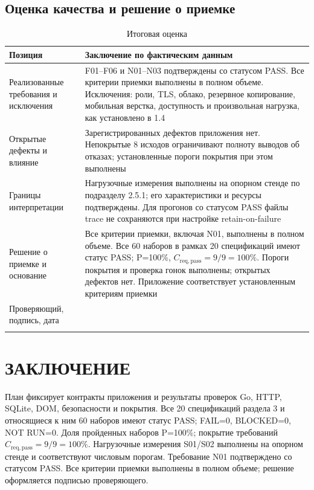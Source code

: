\documentclass[12pt,a4paper]{extarticle}
\newcommand{\struct}[1]{%
  \clearpage\begingroup
  \titlespacing*{\section}{0pt}{0pt}{18pt}%
  \section*{\centering #1}\endgroup%
  \addcontentsline{toc}{section}{#1}}
\begin{document}
\subsection{Оценка качества и решение о приемке}
\begin{longtable}{|P{54mm}|P{98mm}|}
\caption{Итоговая оценка}\\\hline
Позиция & Заключение по фактическим данным \\\hline
Реализованные требования и исключения & F01--F06 и N01--N03 подтверждены
со статусом PASS. Все критерии приемки выполнены в полном объеме.
Исключения: роли, TLS, облако, резервное копирование, мобильная верстка,
доступность и произвольная нагрузка, как установлено в 1.4 \\\hline
Открытые дефекты и влияние & Зарегистрированных дефектов приложения нет.
Непокрытые 8 исходов ограничивают полноту выводов об отказах;
установленные пороги покрытия при этом выполнены \\\hline
Границы интерпретации & Нагрузочные измерения выполнены на опорном стенде
по подразделу 2.5.1; его характеристики и ресурсы подтверждены.
Для прогонов со статусом PASS файлы trace не сохраняются
при настройке retain-on-failure \\\hline
Решение о приемке и основание & Все критерии приемки, включая N01,
выполнены в полном объеме. Все 60 наборов в рамках 20 спецификаций
имеют статус PASS; P=100\%, $C_{\mathrm{req,pass}}=9/9=100\%$.
Пороги покрытия и проверка гонок выполнены; открытых дефектов нет.
Приложение соответствует установленным критериям приемки \\\hline
Проверяющий, подпись, дата & \underline{\hspace{6cm}}\\[6pt]
& \underline{\hspace{6cm}} \\\hline
\end{longtable}

\struct{ЗАКЛЮЧЕНИЕ}
План фиксирует контракты приложения и результаты проверок Go, HTTP,
SQLite, DOM, безопасности и покрытия. Все 20 спецификаций раздела 3
и относящиеся к ним 60 наборов имеют статус PASS;
FAIL=0, BLOCKED=0, NOT RUN=0. Доля пройденных наборов P=100\%;
покрытие требований $C_{\mathrm{req,pass}}=9/9=100\%$.
Нагрузочные измерения S01/S02 выполнены на опорном стенде и соответствуют
числовым порогам. Требование N01 подтверждено со статусом PASS.
Все критерии приемки выполнены в полном объеме;
решение оформляется подписью проверяющего.
\end{document}
